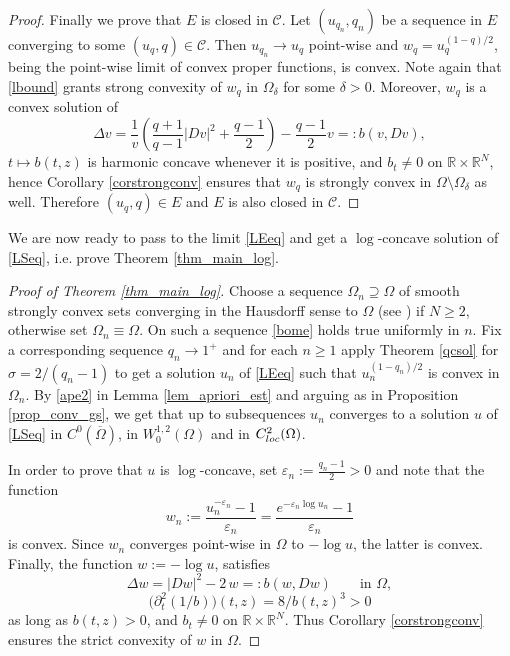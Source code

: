 \documentclass[12pt]{amsart}
\numberwithin{equation}{section}
\theoremstyle{plain}
\theoremstyle{plain}
\theoremstyle{plain}
\theoremstyle{definition}
\newcommand{\R}{{\mathbb R}}
\newcommand{\eps}{\varepsilon}
\renewcommand{\ge}{\geqslant}
\begin{document}
\begin{proof}
Finally we prove that $E$ is closed in ${\mathcal C}$. 
Let $(u_{q_n}, q_n)$ be a sequence in $E$ converging to some $(u_q, q)\in {\mathcal C}$. 
Then $u_{q_n}\to u_q$ point-wise and $w_q=u_q^{(1-q)/2}$, being the point-wise limit of convex proper functions, is convex. 
Note again that \eqref{lbound} grants strong convexity of $w_q$ in $\Omega_\delta$ for some $\delta>0$. Moreover, $w_q$ is a convex solution of 
\[
\Delta v=\frac{1}{v}\left(\frac{q+1}{q-1}|D v|^2+\frac{q-1}{2}\right)-\frac{q-1}{2} v=:b(v, D v),
\]
$t\mapsto b(t, z)$ is harmonic concave whenever it is positive, and $b_t\neq 0$ on $\R\times \R^N$, hence Corollary \ref{corstrongconv} ensures that $w_q$ is strongly convex in $\Omega\setminus \Omega_\delta$ as well. Therefore $(u_q, q)\in E$ and $E$ is also closed in ${\mathcal C}$. 
\end{proof}
 
 We are now ready to pass to the limit \eqref{LEeq} and get a $\log$-concave solution of \eqref{LSeq}, i.e.$\;$prove Theorem \ref{thm_main_log}. 
 
 \begin{proof}[Proof of Theorem \ref{thm_main_log}]
 Choose a sequence $\Omega_n\supseteq \Omega$ of smooth strongly convex sets converging in the Hausdorff sense to $\Omega$ (see \cite[Proposition 2.1]{GaSq25}) if $N\ge 2$, otherwise set $\Omega_n\equiv \Omega$. 
On such a sequence \eqref{bome} holds true uniformly in $n$. Fix a corresponding sequence $q_n \to 1^+$ and for each $n\ge 1$ apply Theorem \ref{qcsol} for $\sigma=2/(q_n-1)$ to get a solution $u_n$ of \eqref{LEeq} such that $u_n^{(1-q_n)/2}$ is convex in $\Omega_n$.
 By \eqref{ape2} in Lemma \ref{lem_apriori_est} and arguing as in Proposition \ref{prop_conv_gs}, we get that up to subsequences $u_n$ converges to a solution $u$ of \eqref{LSeq} in $C^0(\overline{\Omega})$, in $W^{1,2}_0(\Omega)$ and in $C^2_{\rm loc}(\Omega)$. 

 In order to prove that $u$ is $\log$-concave, set $\eps_n:=\frac{q_n-1}{2}>0$ and note that the function
 \[
w_n:= \frac{u_n^{-\eps_n}-1}{\eps_n}=\frac{e^{-\eps_n\log u_n}-1}{\eps_n}
\]
is convex.
Since $w_n$ converges point-wise in $\Omega$ to $-\log u$, the latter is convex. Finally, the function $w:=-\log u$, satisfies
\[
\Delta w=|Dw|^2-2\, w =: b(w, Dw) \qquad \text{in $\Omega$},
\]
\[
\big(\partial^2_t (1/b)\big)(t, z)=8/b(t, z)^3>0
\]
as long as $b(t, z)> 0$, and $b_t\neq 0$ on $\R\times \R^N$. Thus Corollary \ref{corstrongconv} ensures the strict convexity of $w$ in $\Omega$.
 \end{proof}
 
\end{document}
